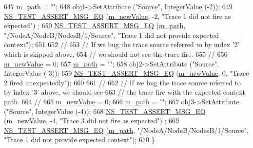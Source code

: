 \begin{DoxyCode}
647   \hyperlink{classObjectVectorTraceConfigTestCase_ab52e8b427f81671e823abbbda41dea69}{m\_path} = \textcolor{stringliteral}{""};
648   obj1->SetAttribute (\textcolor{stringliteral}{"Source"}, IntegerValue (-2));
649   \hyperlink{group__testing_ga2a9d78cffb3db8e867c35fff0b698cf5}{NS\_TEST\_ASSERT\_MSG\_EQ} (\hyperlink{classObjectVectorTraceConfigTestCase_aa09d9661bd785bbeb9db030419138e5f}{m\_newValue}, -2, \textcolor{stringliteral}{"Trace 1 did not fire as expected"})
      ;
650   \hyperlink{group__testing_ga2a9d78cffb3db8e867c35fff0b698cf5}{NS\_TEST\_ASSERT\_MSG\_EQ} (\hyperlink{classObjectVectorTraceConfigTestCase_ab52e8b427f81671e823abbbda41dea69}{m\_path}, \textcolor{stringliteral}{"/NodeA/NodeB/NodesB/1/Source"}, \textcolor{stringliteral}{"Trace 1 did
       not provide expected context"});
651 
652   \textcolor{comment}{// }
653   \textcolor{comment}{// If we bug the trace source referred to by index '2' which is skipped above,}
654   \textcolor{comment}{// we should not see the trace fire.}
655   \textcolor{comment}{//}
656   \hyperlink{classObjectVectorTraceConfigTestCase_aa09d9661bd785bbeb9db030419138e5f}{m\_newValue} = 0;
657   \hyperlink{classObjectVectorTraceConfigTestCase_ab52e8b427f81671e823abbbda41dea69}{m\_path} = \textcolor{stringliteral}{""};
658   obj2->SetAttribute (\textcolor{stringliteral}{"Source"}, IntegerValue (-3));
659   \hyperlink{group__testing_ga2a9d78cffb3db8e867c35fff0b698cf5}{NS\_TEST\_ASSERT\_MSG\_EQ} (\hyperlink{classObjectVectorTraceConfigTestCase_aa09d9661bd785bbeb9db030419138e5f}{m\_newValue}, 0, \textcolor{stringliteral}{"Trace 2 fired unexpectedly"});
660 
661   \textcolor{comment}{// }
662   \textcolor{comment}{// If we bug the trace source referred to by index '3' above, we should see }
663   \textcolor{comment}{// the trace fire with the expected context path.}
664   \textcolor{comment}{//}
665   \hyperlink{classObjectVectorTraceConfigTestCase_aa09d9661bd785bbeb9db030419138e5f}{m\_newValue} = 0;
666   \hyperlink{classObjectVectorTraceConfigTestCase_ab52e8b427f81671e823abbbda41dea69}{m\_path} = \textcolor{stringliteral}{""};
667   obj3->SetAttribute (\textcolor{stringliteral}{"Source"}, IntegerValue (-4));
668   \hyperlink{group__testing_ga2a9d78cffb3db8e867c35fff0b698cf5}{NS\_TEST\_ASSERT\_MSG\_EQ} (\hyperlink{classObjectVectorTraceConfigTestCase_aa09d9661bd785bbeb9db030419138e5f}{m\_newValue}, -4, \textcolor{stringliteral}{"Trace 3 did not fire as expected"})
      ;
669   \hyperlink{group__testing_ga2a9d78cffb3db8e867c35fff0b698cf5}{NS\_TEST\_ASSERT\_MSG\_EQ} (\hyperlink{classObjectVectorTraceConfigTestCase_ab52e8b427f81671e823abbbda41dea69}{m\_path}, \textcolor{stringliteral}{"/NodeA/NodeB/NodesB/1/Source"}, \textcolor{stringliteral}{"Trace 1 did
       not provide expected context"});
670 \}
\end{DoxyCode}


